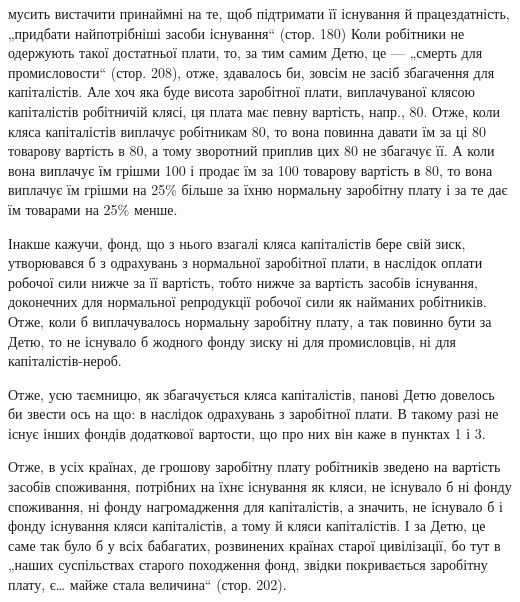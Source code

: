 \parcont{}  %
мусить вистачити принаймні на те, щоб підтримати її існування й
працездатність, „придбати найпотрібніші засоби існування“ (стор. 180)
Коли робітники не одержують такої достатньої плати, то, за тим самим
Детю, це — „смерть для промисловости“ (стор. 208), отже, здавалось би,
зовсім не засіб збагачення для капіталістів. Але хоч яка буде висота заробітної
плати, виплачуваної клясою капіталістів робітничій клясі, ця плата
має певну вартість, напр., 80. Отже, коли кляса капіталістів
виплачує робітникам 80, то вона повинна давати їм за ці 80 товарову вартість в 80, а тому зворотний приплив цих
80 не збагачує її. А коли вона виплачує їм грішми 100
і продає їм за 100 товарову вартість в 80, то вона
виплачує їм грішми на 25\% більше за їхню нормальну заробітну плату
і за те дає їм товарами на 25\% менше.

Інакше кажучи, фонд, що з нього взагалі кляса капіталістів бере свій
зиск, утворювався б з одрахувань з нормальної заробітної плати, в наслідок
оплати робочої сили нижче за її вартість, тобто нижче за вартість засобів
існування, доконечних для нормальної репродукції робочої сили як
найманих робітників. Отже, коли б виплачувалось нормальну заробітну
плату, а так повинно бути за Детю, то не існувало б жодного фонду
зиску ні для промисловців, ні для капіталістів-нероб.

Отже, усю таємницю, як збагачується кляса капіталістів, панові Детю
довелось би звести ось на що: в наслідок одрахувань з заробітної плати.
В такому разі не існує інших фондів додаткової вартости, що про них
він каже в пунктах 1 і 3.

Отже, в усіх країнах, де грошову заробітну плату робітників зведено
на вартість засобів споживання, потрібних на їхнє існування як кляси,
не існувало б ні фонду споживання, ні фонду нагромадження для капіталістів,
а значить, не існувало б і фонду існування кляси капіталістів, а
тому й кляси капіталістів. І за Детю, це саме так було б у всіх бабагатих,
розвинених країнах старої цивілізації, бо тут в „наших суспільствах
старого походження фонд, звідки покривається заробітну плату,
є\dots{} майже стала величина“ (стор. 202).

